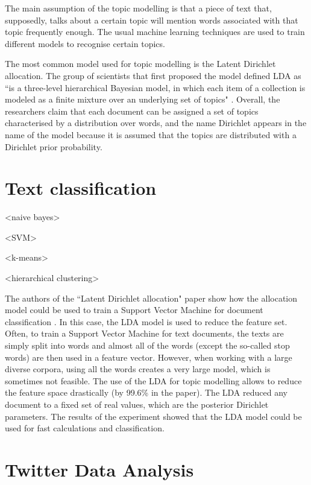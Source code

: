 The main assumption of the topic modelling is that a piece of text that, supposedly, talks about a certain topic will mention words associated with that topic frequently enough. The usual machine learning techniques are used to train different models to recognise certain topics. 

The most common model used for topic modelling is the Latent Dirichlet allocation. The group of scientists that first proposed the model defined LDA as ``is a three-level hierarchical Bayesian model, in which each
item of a collection is modeled as a finite mixture over an underlying set of topics" \cite{blei2003latent}. Overall, the researchers claim that each document can be assigned a set of topics characterised by a distribution over words, and the name Dirichlet appears in the name of the model because it is assumed that the topics are distributed with a Dirichlet prior probability. 

\section{Text classification}
\label{sec:text_classification}

<naive bayes>

<SVM>

<k-means>

<hierarchical clustering>

The authors of the ``Latent Dirichlet allocation" paper show how the allocation model could be used to train a Support Vector Machine for document classification \cite{blei2003latent}. In this case, the LDA model is used to reduce the feature set. Often, to train a Support Vector Machine for text documents, the texts are simply split into words and almost all of the words (except the so-called stop words) are then used in a feature vector. However, when working with a large diverse corpora, using all the words creates a very large model, which is sometimes not feasible. The use of the LDA for topic modelling allows to reduce the feature space drastically (by 99.6\% in the paper). The LDA reduced any document to a fixed set of real values, which are the posterior Dirichlet parameters. The results of the experiment showed that the LDA model could be used for fast calculations and classification. 

\section{Twitter Data Analysis}
\label{sec:twitter_analysis}

